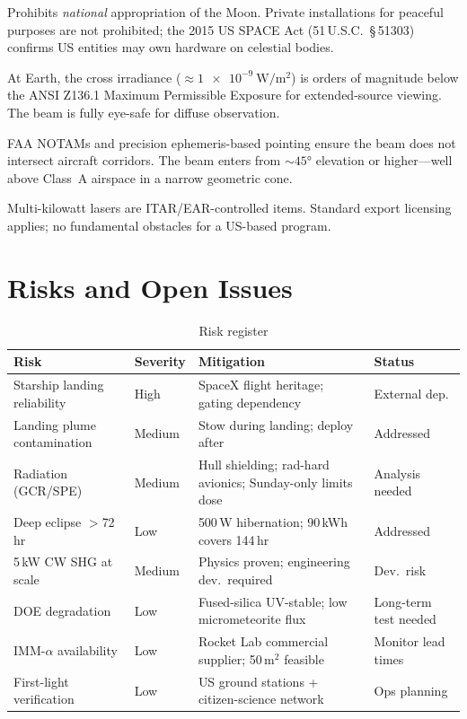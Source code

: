 \documentclass[10pt,letterpaper]{article}
\begin{document}
\begin{description}[leftmargin=1.5em, style=nextline]
  \item[Outer Space Treaty (1967), Article II]
    Prohibits \emph{national} appropriation of the Moon. Private installations
    for peaceful purposes are not prohibited; the 2015 US SPACE Act (51\,U.S.C.\
    \S\,51303) confirms US entities may own hardware on celestial bodies.
  \item[Laser safety]
    At Earth, the cross irradiance ($\approx\SI{1e-9}{\watt\per\meter\squared}$)
    is orders of magnitude below the ANSI Z136.1 Maximum Permissible Exposure for
    extended-source viewing. The beam is fully eye-safe for diffuse observation.
  \item[Aviation]
    FAA NOTAMs and precision ephemeris-based pointing ensure the beam does not
    intersect aircraft corridors. The beam enters from $\sim\ang{45}$ elevation
    or higher---well above Class~A airspace in a narrow geometric cone.
  \item[Export control]
    Multi-kilowatt lasers are ITAR/EAR-controlled items. Standard export
    licensing applies; no fundamental obstacles for a US-based program.
\end{description}

\section{Risks and Open Issues}

\begin{table}[!ht]
\centering\small
\caption{Risk register}
\label{tab:risks}
\begin{tabular}{p{4cm}lp{4.5cm}l}
\toprule
\textbf{Risk} & \textbf{Severity} & \textbf{Mitigation} & \textbf{Status} \\
\midrule
Starship landing reliability & High & SpaceX flight heritage; gating dependency & External dep. \\
Landing plume contamination & Medium & Stow during landing; deploy after & Addressed \\
Radiation (GCR/SPE) & Medium & Hull shielding; rad-hard avionics; Sunday-only limits dose & Analysis needed \\
Deep eclipse $>$72\,hr & Low & 500\,W hibernation; 90\,kWh covers 144\,hr & Addressed \\
5\,kW CW SHG at scale & Medium & Physics proven; engineering dev.\ required & Dev.\ risk \\
DOE degradation & Low & Fused-silica UV-stable; low micrometeorite flux & Long-term test needed \\
IMM-$\alpha$ availability & Low & Rocket Lab commercial supplier; 50\,m$^2$ feasible & Monitor lead times \\
First-light verification & Low & US ground stations + citizen-science network & Ops planning \\
\bottomrule
\end{tabular}
\end{table}
\end{document}
